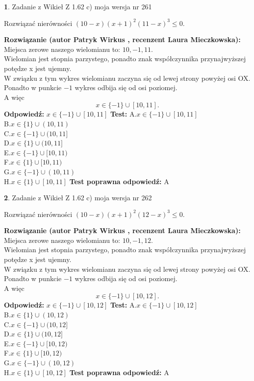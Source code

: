 \documentclass[12pt, a4paper]{article}
\theoremstyle{definition} %
\newtheorem{zad}{}
\newcommand{\zadStart}[1]{\begin{zad}#1\newline}
\newcommand{\zadStop}{\end{zad}}
\newcommand{\rozwStart}[2]{\noindent \textbf{Rozwiązanie (autor #1 , recenzent #2): }\newline}
\newcommand{\rozwStop}{\newline}
\newcommand{\odpStart}{\noindent \textbf{Odpowiedź:}\newline}
\newcommand{\odpStop}{\newline}
\newcommand{\testStart}{\noindent \textbf{Test:}\newline}
\newcommand{\testStop}{\newline}
\newcommand{\kluczStart}{\noindent \textbf{Test poprawna odpowiedź:}\newline}
\newcommand{\kluczStop}{\newline}
\begin{document}
\zadStart{Zadanie z Wikieł Z 1.62 c) moja wersja nr 261}

Rozwiązać nierówności $(10-x)(x+1)^{2}(11-x)^{3}\le0$.
\zadStop
\rozwStart{Patryk Wirkus}{Laura Mieczkowska}
Miejsca zerowe naszego wielomianu to: $10, -1, 11$.\\
Wielomian jest stopnia parzystego, ponadto znak współczynnika przy\linebreak najwyższej potędze x jest ujemny.\\ W związku z tym wykres wielomianu zaczyna się od lewej strony powyżej osi OX.\\
Ponadto w punkcie $-1$ wykres odbija się od osi poziomej.\\
A więc $$x \in \{-1\} \cup [10,11].$$
\rozwStop
\odpStart
$x \in \{-1\} \cup [10,11]$
\odpStop
\testStart
A.$x \in \{-1\} \cup [10,11]$\\
B.$x \in \{1\} \cup (10,11)$\\
C.$x \in \{-1\} \cup (10,11]$\\
D.$x \in \{1\} \cup (10,11]$\\
E.$x \in \{-1\} \cup [10,11)$\\
F.$x \in \{1\} \cup [10,11)$\\
G.$x \in \{-1\} \cup (10,11)$\\
H.$x \in \{1\} \cup [10,11]$
\testStop
\kluczStart
A
\kluczStop



\zadStart{Zadanie z Wikieł Z 1.62 c) moja wersja nr 262}

Rozwiązać nierówności $(10-x)(x+1)^{2}(12-x)^{3}\le0$.
\zadStop
\rozwStart{Patryk Wirkus}{Laura Mieczkowska}
Miejsca zerowe naszego wielomianu to: $10, -1, 12$.\\
Wielomian jest stopnia parzystego, ponadto znak współczynnika przy\linebreak najwyższej potędze x jest ujemny.\\ W związku z tym wykres wielomianu zaczyna się od lewej strony powyżej osi OX.\\
Ponadto w punkcie $-1$ wykres odbija się od osi poziomej.\\
A więc $$x \in \{-1\} \cup [10,12].$$
\rozwStop
\odpStart
$x \in \{-1\} \cup [10,12]$
\odpStop
\testStart
A.$x \in \{-1\} \cup [10,12]$\\
B.$x \in \{1\} \cup (10,12)$\\
C.$x \in \{-1\} \cup (10,12]$\\
D.$x \in \{1\} \cup (10,12]$\\
E.$x \in \{-1\} \cup [10,12)$\\
F.$x \in \{1\} \cup [10,12)$\\
G.$x \in \{-1\} \cup (10,12)$\\
H.$x \in \{1\} \cup [10,12]$
\testStop
\kluczStart
A
\kluczStop
\end{document}
